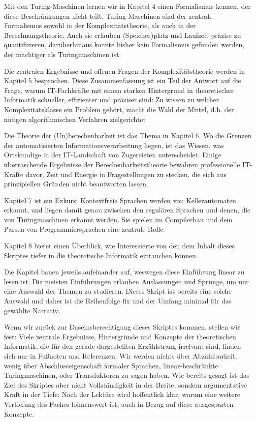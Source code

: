 Mit den Turing-Maschinen lernen wir in Kapitel 4 einen Formalismus kennen,
der diese Beschränkungen nicht teilt.
Turing-Maschinen sind der zentrale Formalismus sowohl
in der Komplexitätstheorie,
als auch in der Berechnungstheorie.
Auch sie erlauben (Speicher)platz und Laufzeit präzise zu quantifizieren,
darüberhinaus konnte bisher kein Formalismus gefunden werden,
der mächtiger als Turingmaschinen ist.

Die zentralen Ergebnisse und offenen Fragen der Komplexitätstheorie
werden in Kapitel 5 besprochen.
Diese Zusammenfassung ist ein Teil der Antwort auf die Frage,
warum IT-Fachkräfte mit einem starken Hintergrund in theoretischer Informatik
schneller, effizienter und präziser sind:
Zu wissen zu welcher Komplexitätsklasse ein Problem gehört,
macht die Wahl der Mittel, d.h. der nötigen algorithmischen Verfahren zielgerichtet

Die Theorie der (Un)berechenbarkeit ist das Thema in Kapitel 6.
Wo die Grenzen der automatisierten Informationsverarbeitung liegen,
ist das Wissen,
was Ortskundige in der IT-Landschaft von Zugereisten unterscheidet.
Einige überraschende Ergebnisse der Berechenbarkeitstheorie
bewahren professionelle IT-Kräfte davor,
Zeit und Energie in Fragestellungen zu stecken,
die sich aus prinzipiellen Gründen nicht beantworten lassen.

Kapitel 7 ist ein Exkurs: Kontextfreie Sprachen werden von Kellerautomaten erkannt,
und liegen damit genau zwischen den regulären Sprachen
und denen, die von Turingmaschinen erkannt werden.
Sie spielen im Compilerbau und dem Parsen von Programmiersprachen eine zentrale Rolle.

Kapitel 8 bietet einen Überblick,
wie Interessierte von den dem Inhalt dieses Skriptes tiefer in die theoretische Informatik
eintauchen können.

Die Kapitel bauen jeweils aufeinander auf,
weswegen diese Einführung linear zu lesen ist.
Die meisten Einführungen erlauben Auslassungen und Sprünge,
um nur eine Auswahl der Themen zu studieren.
Dieses Skript ist bereits eine solche Auswahl
und daher ist die Reihenfolge fix
und der Umfang minimal für das gewählte Narrativ.

Wenn wir zurück zur Daseinsberechtigung dieses Skriptes kommen,
stellen wir fest:
Viele zentrale Ergebnisse, Hintergründe und Konzepte
der theoretischen Informatik,
die für den gerade dargestellten Erzählstrang irrelvant sind,
finden sich nur in Fußnoten und Referenzen:
Wir werden nichts über Abzählbarkeit,
wenig über Abschlusseigenschaft formaler Sprachen,
linear-beschränkte Turingmaschinen,
oder Transduktoren zu sagen haben.
Wie bereits gesagt ist das Ziel des Skriptes aber nicht Vollständigkeit in der Breite,
sondern argumentative Kraft in der Tiefe:
Nach der Lektüre wird hoffentlich klar,
warum eine weitere Vertiefung des Faches lohnenswert ist,
auch in Bezug auf diese ausgesparten Konzepte.


